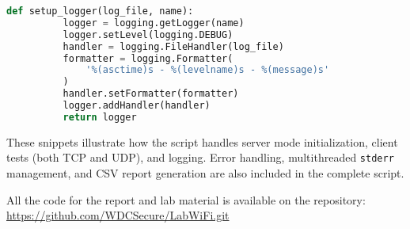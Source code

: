         \begin{lstlisting}[language=Python, caption={Excerpt for logging setup.}]
      def setup_logger(log_file, name):
          logger = logging.getLogger(name)
          logger.setLevel(logging.DEBUG)
          handler = logging.FileHandler(log_file)
          formatter = logging.Formatter(
              '%(asctime)s - %(levelname)s - %(message)s'
          )
          handler.setFormatter(formatter)
          logger.addHandler(handler)
          return logger
        \end{lstlisting}

    \noindent These snippets illustrate how the script handles server mode initialization, client tests (both TCP and UDP), and logging. 
    Error handling, multithreaded \texttt{stderr} management, and CSV report generation are also included in the complete script.
    
    \noindent All the code for the report and lab material is available on the repository: \url{https://github.com/WDCSecure/LabWiFi.git}
